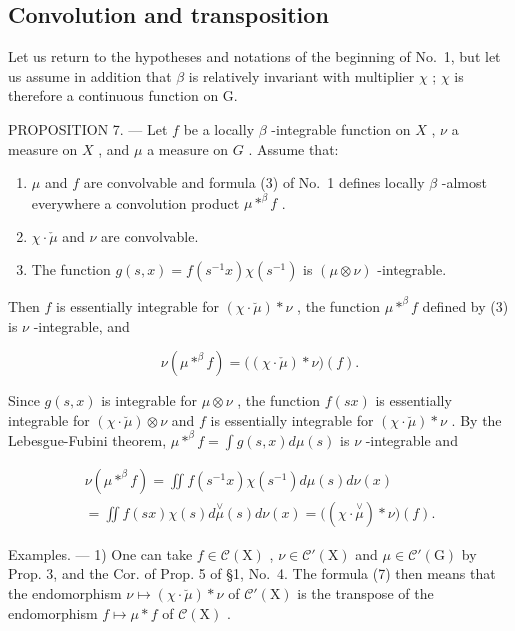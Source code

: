 \subsection{Convolution and transposition}

Let us return to the hypotheses and notations of the beginning of No.~1, but let us assume in addition that \(\beta\) is relatively invariant with multiplier \(\chi\) ; \(\chi\) is therefore a continuous function on G.

PROPOSITION 7. --- Let \(f\) be a locally \(\beta\) -integrable function on \(X\) , \(\nu\) a measure on \(X\) , and \(\mu\) a measure on \(G\) . Assume that:

\begin{enumerate}
\def\labelenumi{(\roman{enumi})}
\item
  \(\mu\) and \(f\) are convolvable and formula (3) of No.~1 defines locally \(\beta\) -almost everywhere a convolution product \(\mu *^{\beta} f\) .
\item
  \(\chi \cdot \check{\mu}\) and \(\nu\) are convolvable.
\item
  The function \(g(s,x) = f(s^{-1}x)\chi (s^{-1})\) is \((\mu \otimes \nu)\) -integrable.
\end{enumerate}

Then \(f\) is essentially integrable for \((\chi \cdot \breve{\mu}) * \nu\) , the function \(\mu *^{\beta} f\) defined by (3) is \(\nu\) -integrable, and

\[
\nu (\mu * ^ {\beta} f) = \big ((\chi \cdot \check {\mu}) * \nu \big) (f).\tag{7}
\]

Since \(g(s, x)\) is integrable for \(\mu \otimes \nu\) , the function \(f(sx)\) is essentially integrable for \((\chi \cdot \breve{\mu}) \otimes \nu\) and \(f\) is essentially integrable for \((\chi \cdot \breve{\mu}) * \nu\) . By the Lebesgue-Fubini theorem, \(\mu *^{\beta} f = \int g(s, x) d\mu(s)\) is \(\nu\) -integrable and

\[
\begin{array}{l} \nu (\mu * ^ {\beta} f) = \iint f (s ^ {- 1} x) \chi (s ^ {- 1}) d \mu (s) d \nu (x) \\ = \iint f (s x) \chi (s) d \stackrel {\vee} {\mu} (s) d \nu (x) = \big ((\chi \cdot \stackrel {\vee} {\mu}) * \nu \big) (f). \end{array}
\]

Examples. --- 1) One can take \(f \in \mathcal{C}(\mathrm{X})\) , \(\nu \in \mathcal{C}'(\mathrm{X})\) and \(\mu \in \mathcal{C}'(\mathrm{G})\) by Prop. 3, and the Cor. of Prop. 5 of §1, No.~4. The formula (7) then means that the endomorphism \(\nu \mapsto (\chi \cdot \breve{\mu}) * \nu\) of \(\mathcal{C}'(\mathrm{X})\) is the transpose of the endomorphism \(f \mapsto \mu * f\) of \(\mathcal{C}(\mathrm{X})\) .


